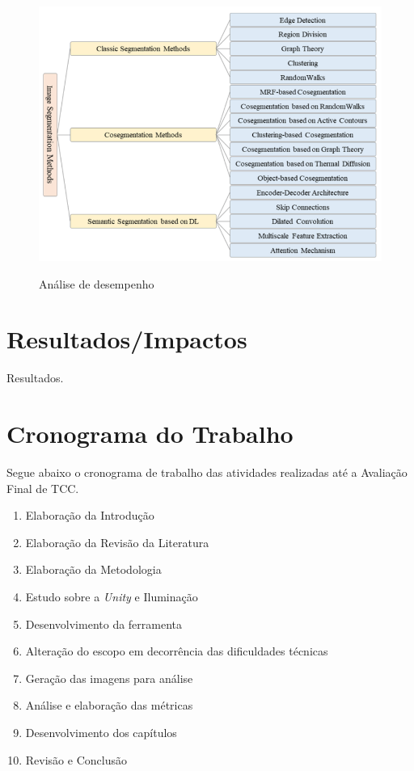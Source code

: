 \FloatBarrier
\begin{figure}[ht]
    \caption{Análise de desempenho}
    \centering
    \includegraphics[scale=0.5]{imagens/metodos_segmentacao.png}
    \label{fig:grafico_desempenho}
\end{figure}
\FloatBarrier


\section{Resultados/Impactos}

Resultados.

\section{Cronograma do Trabalho}

Segue abaixo o cronograma de trabalho das atividades realizadas até a Avaliação Final de TCC.

\begin{enumerate}
	\item Elaboração da Introdução
	\item Elaboração da Revisão da Literatura
	\item Elaboração da Metodologia
	\item Estudo sobre a \textit{Unity} e Iluminação
	\item Desenvolvimento da ferramenta
    \item Alteração do escopo em decorrência das dificuldades técnicas 
    \item Geração das imagens para análise
    \item Análise e elaboração das métricas
    \item Desenvolvimento dos capítulos
    \item Revisão e Conclusão
\end{enumerate}

